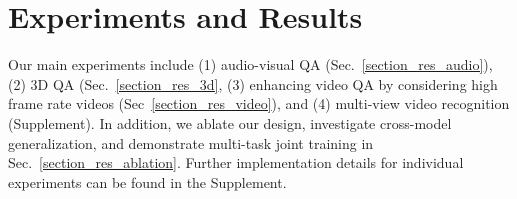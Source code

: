 \section{Experiments and Results}\label{sec:experiments}
Our main experiments include (1) audio-visual QA (Sec.\ \ref{section_res_audio}), (2) 3D QA (Sec.\ \ref{section_res_3d}, (3) enhancing video QA by considering high frame rate videos (Sec\ \ref{section_res_video}), and (4) multi-view video recognition (Supplement). In addition, we ablate our design, investigate cross-model generalization, and demonstrate multi-task joint training in Sec.\ \ref{section_res_ablation}. Further implementation details for individual experiments can be found in the Supplement.  



